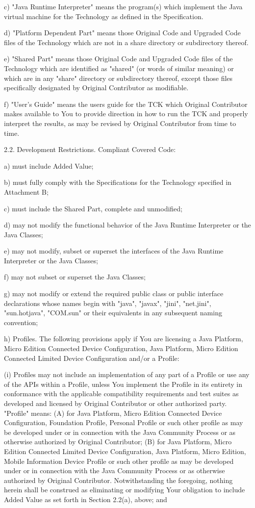 {c) "Java Runtime Interpreter" means the program(s) which implement the
Java virtual machine for the Technology as defined in the
Specification.

d) "Platform Dependent Part" means those Original Code and Upgraded
Code files of the Technology which are not in a share directory or
subdirectory thereof.

e) "Shared Part" means those Original Code and Upgraded Code files of
the Technology which are identified as "shared" (or words of similar
meaning) or which are in any "share" directory or subdirectory
thereof, except those files specifically designated by Original
Contributor as modifiable.

f) "User's Guide" means the users guide for the TCK which Original
Contributor makes available to You to provide direction in how to run
the TCK and properly interpret the results, as may be revised by
Original Contributor from time to time.

2.2.  Development Restrictions.  Compliant Covered Code:

a) must include Added Value;

b) must fully comply with the Specifications for the Technology
specified in Attachment B;

c) must include the Shared Part, complete and unmodified;

d) may not modify the functional behavior of the Java Runtime
Interpreter or the Java Classes;

e) may not modify, subset or superset the interfaces of the Java
Runtime Interpreter or the Java Classes;

f) may not subset or superset the Java Classes;

g) may not modify or extend the required public class or public
interface declarations whose names begin with "java", "javax", "jini",
"net.jini", "sun.hotjava", "COM.sun" or their equivalents in any
subsequent naming convention;

h) Profiles.  The following provisions apply if You are licensing a
Java Platform, Micro Edition Connected Device Configuration, Java
Platform, Micro Edition Connected Limited Device Configuration and/or
a Profile:

(i) Profiles may not include an implementation of any part of a
Profile or use any of the APIs within a Profile, unless You implement
the Profile in its entirety in conformance with the applicable
compatibility requirements and test suites as developed and licensed
by Original Contributor or other authorized party.  "Profile" means:
(A) for Java Platform, Micro Edition Connected Device Configuration,
Foundation Profile, Personal Profile or such other profile as may be
developed under or in connection with the Java Community Process or as
otherwise authorized by Original Contributor; (B) for Java Platform,
Micro Edition Connected Limited Device Configuration, Java Platform,
Micro Edition, Mobile Information Device Profile or such other profile
as may be developed under or in connection with the Java Community
Process or as otherwise authorized by Original Contributor.
Notwithstanding the foregoing, nothing herein shall be construed as
eliminating or modifying Your obligation to include Added Value as set
forth in Section 2.2(a), above; and

}
